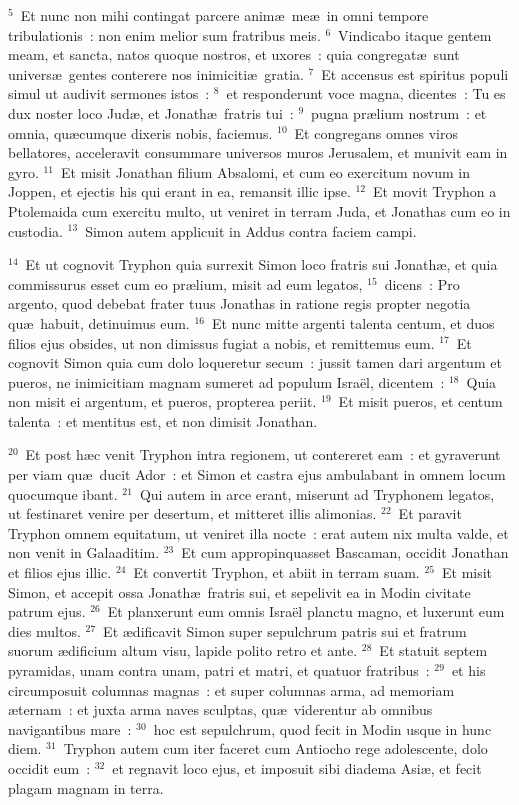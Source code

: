 ${}^{5}$~Et nunc non mihi contingat parcere anim\ae\ me\ae\ in omni tempore tribulationis~: non enim melior sum fratribus meis.
${}^{6}$~Vindicabo itaque gentem meam, et sancta, natos quoque nostros, et uxores~: quia congregat\ae\ sunt univers\ae\ gentes conterere nos inimiciti\ae\ gratia.
${}^{7}$~Et accensus est spiritus populi simul ut audivit sermones istos~:
${}^{8}$~et responderunt voce magna, dicentes~: Tu es dux noster loco Jud\ae , et Jonath\ae\ fratris tui~:
${}^{9}$~pugna pr\ae lium nostrum~: et omnia, qu\ae cumque dixeris nobis, faciemus.
${}^{10}$~Et congregans omnes viros bellatores, acceleravit consummare universos muros Jerusalem, et munivit eam in gyro.
${}^{11}$~Et misit Jonathan filium Absalomi, et cum eo exercitum novum in Joppen, et ejectis his qui erant in ea, remansit illic ipse.
${}^{12}$~Et movit Tryphon a Ptolemaida cum exercitu multo, ut veniret in terram Juda, et Jonathas cum eo in custodia.
${}^{13}$~Simon autem applicuit in Addus contra faciem campi.


${}^{14}$~Et ut cognovit Tryphon quia surrexit Simon loco fratris sui Jonath\ae , et quia commissurus esset cum eo pr\ae lium, misit ad eum legatos,
${}^{15}$~dicens~: Pro argento, quod debebat frater tuus Jonathas in ratione regis propter negotia qu\ae\ habuit, detinuimus eum.
${}^{16}$~Et nunc mitte argenti talenta centum, et duos filios ejus obsides, ut non dimissus fugiat a nobis, et remittemus eum.
${}^{17}$~Et cognovit Simon quia cum dolo loqueretur secum~: jussit tamen dari argentum et pueros, ne inimicitiam magnam sumeret ad populum Isra\"el, dicentem~:
${}^{18}$~Quia non misit ei argentum, et pueros, propterea periit.
${}^{19}$~Et misit pueros, et centum talenta~: et mentitus est, et non dimisit Jonathan.


${}^{20}$~Et post h\ae c venit Tryphon intra regionem, ut contereret eam~: et gyraverunt per viam qu\ae\ ducit Ador~: et Simon et castra ejus ambulabant in omnem locum quocumque ibant.
${}^{21}$~Qui autem in arce erant, miserunt ad Tryphonem legatos, ut festinaret venire per desertum, et mitteret illis alimonias.
${}^{22}$~Et paravit Tryphon omnem equitatum, ut veniret illa nocte~: erat autem nix multa valde, et non venit in Galaaditim.
${}^{23}$~Et cum appropinquasset Bascaman, occidit Jonathan et filios ejus illic.
${}^{24}$~Et convertit Tryphon, et abiit in terram suam.
${}^{25}$~Et misit Simon, et accepit ossa Jonath\ae\ fratris sui, et sepelivit ea in Modin civitate patrum ejus.
${}^{26}$~Et planxerunt eum omnis Isra\"el planctu magno, et luxerunt eum dies multos.
${}^{27}$~Et \ae dificavit Simon super sepulchrum patris sui et fratrum suorum \ae dificium altum visu, lapide polito retro et ante.
${}^{28}$~Et statuit septem pyramidas, unam contra unam, patri et matri, et quatuor fratribus~:
${}^{29}$~et his circumposuit columnas magnas~: et super columnas arma, ad memoriam \ae ternam~: et juxta arma naves sculptas, qu\ae\ viderentur ab omnibus navigantibus mare~:
${}^{30}$~hoc est sepulchrum, quod fecit in Modin usque in hunc diem.
${}^{31}$~Tryphon autem cum iter faceret cum Antiocho rege adolescente, dolo occidit eum~:
${}^{32}$~et regnavit loco ejus, et imposuit sibi diadema Asi\ae , et fecit plagam magnam in terra.


